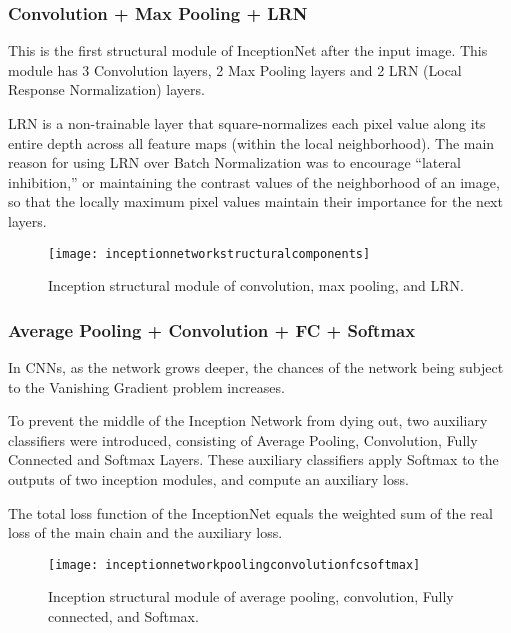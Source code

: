 	\subsubsection{Convolution + Max Pooling + LRN}
	\begin{bulletedlist}
		\item This is the first structural module of InceptionNet after the input image. This module has 3 Convolution layers, 2 Max Pooling layers and 2 LRN (Local Response Normalization) layers.
		\item LRN is a non-trainable layer that square-normalizes each pixel value along its entire depth across all feature maps (within the local neighborhood). The main reason for using LRN over Batch Normalization was to encourage ``lateral inhibition,'' or maintaining the contrast values of the neighborhood of an image, so that the locally maximum pixel values maintain their importance for the next layers.
	\end{bulletedlist}

	\begin{figure}[tbh]
		\centering
		\texttt{[image: inceptionnetworkstructuralcomponents]}
		\caption[Inception structural module of convolution, max pooling, and LRN]{Inception structural module of convolution, max pooling, and LRN.}
		\label{fig:inceptionnetworkstructuralcomponents}
	\end{figure}

	\subsubsection{Average Pooling + Convolution + FC + Softmax}	
	\begin{bulletedlist}
		\item In CNNs, as the network grows deeper, the chances of the network being subject to the Vanishing Gradient problem increases.
		\item To prevent the middle of the Inception Network from dying out, two auxiliary classifiers were introduced, consisting of Average Pooling, Convolution, Fully Connected and Softmax Layers.  These auxiliary classifiers apply Softmax to the outputs of two inception modules, and compute an auxiliary loss.
		\item The total loss function of the InceptionNet equals the weighted sum of the real loss of the main chain and the auxiliary loss.
	\end{bulletedlist}

	\begin{figure}[tbh]
		\centering
		\texttt{[image: inceptionnetworkpoolingconvolutionfcsoftmax]}
		\caption[Inception structural module of average pooling, convolution, FC, and Softmax]{Inception structural module of average pooling, convolution, Fully connected, and Softmax.}
		\label{fig:inceptionnetworkpoolingconvolutionfcsoftmax}
	\end{figure}


